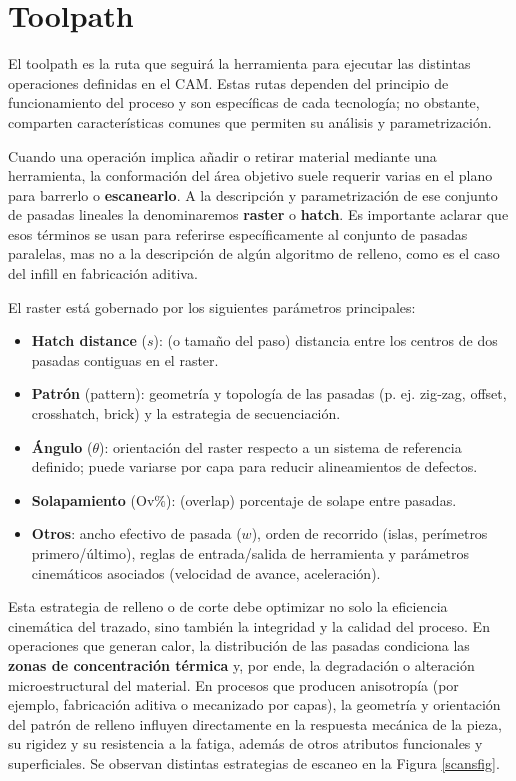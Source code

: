 \section{Toolpath}

El toolpath es la ruta que seguirá la herramienta para ejecutar las distintas operaciones definidas en el CAM. Estas rutas dependen del principio de funcionamiento del proceso y son específicas de cada tecnología; no obstante, comparten características comunes que permiten su análisis y parametrización. 

Cuando una operación implica añadir o retirar material mediante una herramienta, la conformación del área objetivo suele requerir varias  en el plano para barrerlo o \textbf{escanearlo}. A la descripción y parametrización de ese conjunto de pasadas lineales la denominaremos \textbf{raster} o \textbf{hatch}. Es importante aclarar que esos términos se usan para referirse específicamente al conjunto de pasadas paralelas, mas no a la descripción de algún algoritmo de relleno, como es el caso del infill en fabricación aditiva.

El raster está gobernado por los siguientes parámetros principales:

\begin{itemize}
	\item \textbf{Hatch distance} (\(s\)): (o tamaño del paso) distancia entre los centros de dos pasadas contiguas en el raster.
	\item \textbf{Patrón} (pattern): geometría y topología de las pasadas (p. ej. zig‑zag, offset, crosshatch, brick) y la estrategia de secuenciación.
	\item \textbf{Ángulo} (\(\theta\)): orientación del raster respecto a un sistema de referencia definido; puede variarse por capa para reducir alineamientos de defectos.
	\item \textbf{Solapamiento} (Ov$\%$): (overlap) porcentaje de solape entre pasadas.
	\item \textbf{Otros}: ancho efectivo de pasada (\(w\)), orden de recorrido (islas, perímetros primero/último), reglas de entrada/salida de herramienta y parámetros cinemáticos asociados (velocidad de avance, aceleración).
\end{itemize}

Esta estrategia de relleno o de corte debe optimizar no solo la eficiencia cinemática del trazado, sino también la integridad y la calidad del proceso. En operaciones que generan calor, la distribución de las pasadas condiciona las \textbf{zonas de concentración térmica} y, por ende, la degradación o alteración microestructural del material. En procesos que producen anisotropía (por ejemplo, fabricación aditiva o mecanizado por capas), la geometría y orientación del patrón de relleno influyen directamente en la respuesta mecánica de la pieza, su rigidez y su resistencia a la fatiga, además de otros atributos funcionales y superficiales. Se observan distintas estrategias de escaneo en la Figura \ref{scansfig}.

